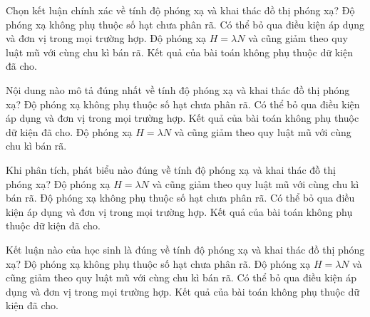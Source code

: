 \begin{ex}
Chọn kết luận chính xác về tính độ phóng xạ và khai thác đồ thị phóng xạ?
\choice
{Độ phóng xạ không phụ thuộc số hạt chưa phân rã.}
{Có thể bỏ qua điều kiện áp dụng và đơn vị trong mọi trường hợp.}
{\True Độ phóng xạ $H=\lambda N$ và cũng giảm theo quy luật mũ với cùng chu kì bán rã.}
{Kết quả của bài toán không phụ thuộc dữ kiện đã cho.}
\end{ex}

\begin{ex}
Nội dung nào mô tả đúng nhất về tính độ phóng xạ và khai thác đồ thị phóng xạ?
\choice
{Độ phóng xạ không phụ thuộc số hạt chưa phân rã.}
{Có thể bỏ qua điều kiện áp dụng và đơn vị trong mọi trường hợp.}
{Kết quả của bài toán không phụ thuộc dữ kiện đã cho.}
{\True Độ phóng xạ $H=\lambda N$ và cũng giảm theo quy luật mũ với cùng chu kì bán rã.}
\end{ex}

\begin{ex}
Khi phân tích, phát biểu nào đúng về tính độ phóng xạ và khai thác đồ thị phóng xạ?
\choice
{\True Độ phóng xạ $H=\lambda N$ và cũng giảm theo quy luật mũ với cùng chu kì bán rã.}
{Độ phóng xạ không phụ thuộc số hạt chưa phân rã.}
{Có thể bỏ qua điều kiện áp dụng và đơn vị trong mọi trường hợp.}
{Kết quả của bài toán không phụ thuộc dữ kiện đã cho.}
\end{ex}

\begin{ex}
Kết luận nào của học sinh là đúng về tính độ phóng xạ và khai thác đồ thị phóng xạ?
\choice
{Độ phóng xạ không phụ thuộc số hạt chưa phân rã.}
{\True Độ phóng xạ $H=\lambda N$ và cũng giảm theo quy luật mũ với cùng chu kì bán rã.}
{Có thể bỏ qua điều kiện áp dụng và đơn vị trong mọi trường hợp.}
{Kết quả của bài toán không phụ thuộc dữ kiện đã cho.}
\end{ex}

